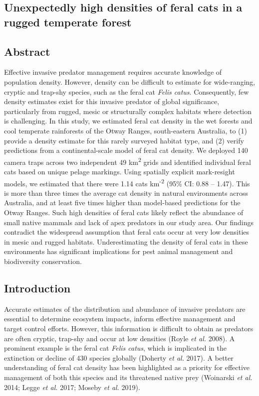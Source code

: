 \documentclass[11pt,a4paper,titlepage,twoside,openright]{style/unimelbthesis}
\begin{document}
\begin{mainmatter}
{\chapter{Unexpectedly high densities of feral cats in a rugged temperate forest}\label{otways17}}

\hypertarget{abstract-2}{%
\section*{Abstract}\label{abstract-2}}

Effective invasive predator management requires accurate knowledge of population density. However, density can be difficult to estimate for wide-ranging, cryptic and trap-shy species, such as the feral cat \emph{Felis catus}. Consequently, few density estimates exist for this invasive predator of global significance, particularly from rugged, mesic or structurally complex habitats where detection is challenging. In this study, we estimated feral cat density in the wet forests and cool temperate rainforests of the Otway Ranges, south-eastern Australia, to (1) provide a density estimate for this rarely surveyed habitat type, and (2) verify predictions from a continental-scale model of feral cat density. We deployed 140 camera traps across two independent 49 km\textsuperscript{2} grids and identified individual feral cats based on unique pelage markings. Using spatially explicit mark-resight models, we estimated that there were 1.14 cats km\textsuperscript{-2} (95\% CI: 0.88 -- 1.47). This is more than three times the average cat density in natural environments across Australia, and at least five times higher than model-based predictions for the Otway Ranges. Such high densities of feral cats likely reflect the abundance of small native mammals and lack of apex predators in our study area. Our findings contradict the widespread assumption that feral cats occur at very low densities in mesic and rugged habitats. Underestimating the density of feral cats in these environments has significant implications for pest animal management and biodiversity conservation.

\newpage

\hypertarget{introduction-3}{%
\section{Introduction}\label{introduction-3}}

Accurate estimates of the distribution and abundance of invasive predators are essential to determine ecosystem impacts, inform effective management and target control efforts. However, this information is difficult to obtain as predators are often cryptic, trap-shy and occur at low densities (Royle \emph{et al.} 2008). A prominent example is the feral cat \emph{Felis catus}, which is implicated in the extinction or decline of 430 species globally (Doherty \emph{et al.} 2017). A better understanding of feral cat density has been highlighted as a priority for effective management of both this species and its threatened native prey (Woinarski \emph{et al.} 2014; Legge \emph{et al.} 2017; Moseby \emph{et al.} 2019).


\end{mainmatter}
\end{document}
